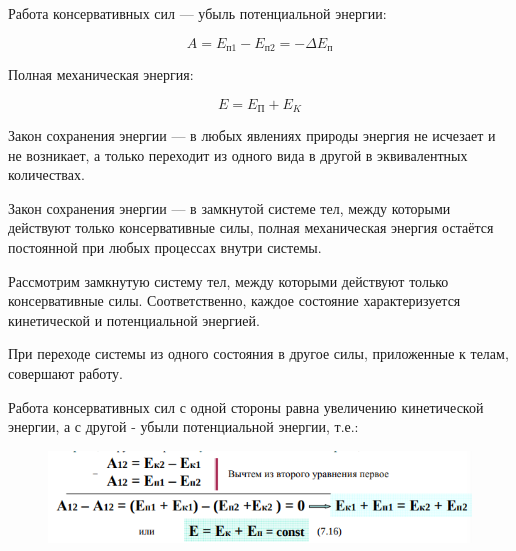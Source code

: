 \begin{definition}
    Работа консервативных сил — убыль потенциальной энергии:

    $$
    A=E_{п1}-E_{п2}=-\Delta E_{п}
    $$
\end{definition}

\begin{definition}
    Полная механическая энергия:

    $$
    E=E_П+E_K
    $$
\end{definition}

\begin{definition}
    Закон сохранения энергии  — в любых явлениях природы энергия не исчезает и не возникает, а только переходит из одного вида в другой в эквивалентных количествах.

    Закон сохранения энергии  — в замкнутой системе тел, между которыми действуют только консервативные силы, полная механическая энергия остаётся постоянной при любых процессах внутри системы.

    Рассмотрим замкнутую систему тел, между которыми действуют только консервативные силы. Соответственно, каждое состояние характеризуется кинетической и потенциальной энергией.

    При переходе системы из одного состояния в другое силы, приложенные к телам, совершают работу.
\end{definition}

Работа консервативных сил с одной стороны равна увеличению кинетической энергии, а с другой - убыли потенциальной энергии, т.е.:

\begin{figure}[h]
    \centering
    \includegraphics[width=0.7\linewidth]{imgs/q7i1.png}
\end{figure}